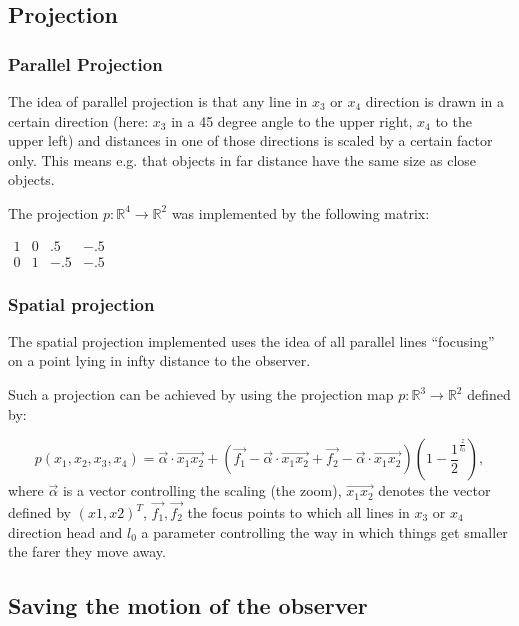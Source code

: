 \documentclass[titlepage]{scrartcl}
\begin{document}
\subsection{Projection}

\subsubsection{Parallel Projection}
The idea of parallel projection is that any line in $x_3$ or $x_4$ direction is drawn in a certain direction (here: $x_3$ in a 45 degree angle to the upper right, $x_4$ to the upper left) and distances in one of those directions is scaled by a certain factor only. This means e.g. that objects in far distance have the same size as close objects. 

The projection $ p : \mathbb{R}^4 \to \mathbb{R}^2$ was implemented by the following matrix: 
\newline

$\begin{array}{cccc}
1 & 0 & .5 & -.5 \\ 
0 & 1 & -.5 & -.5
\end{array} $

\subsubsection{Spatial projection}
The spatial projection implemented uses the idea of all parallel lines \enquote{focusing} on a point lying in infty distance to the observer. 

Such a projection can be achieved by using the projection map $p : \mathbb{R}^3 \to \mathbb{R}^2$ defined by: 

\begin{equation}
p(x_1, x_2, x_3, x_4) = \vec{\alpha} \cdot \vec{x_1 x_2} + (\vec{f_1} - \vec{\alpha} \cdot \vec{x_1 x_2} + \vec{f_2} - \vec{\alpha} \cdot \vec{x_1 x_2})(1 - \frac{1}{2}^{\frac{z}{l_0}}),
\end{equation}
where $\vec{\alpha}$ is a vector controlling the scaling (the zoom), $\vec{x_1 x_2}$ denotes the vector defined by $(x1, x2)^T$, $\vec{f_1}, \vec{f_2}$ the focus points to which all lines in $x_3$ or $x_4$ direction head and $l_0$ a parameter controlling the way in which things get smaller the farer they move away. 

\subsection{Saving the motion of the observer}
\end{document}
